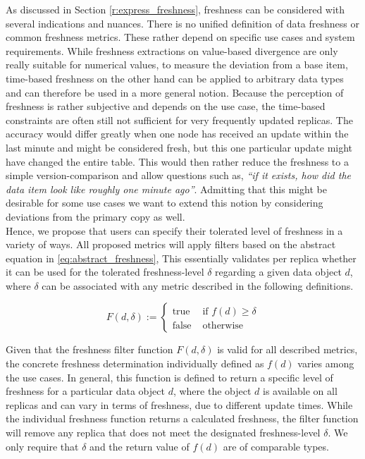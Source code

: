 As discussed in Section \ref{r:express_freshness}, freshness can be considered with several indications and nuances.
There is no unified definition of data freshness or common freshness metrics.
These rather depend on specific use cases and system requirements.
While freshness extractions on value-based divergence are only really suitable for numerical values,
to measure the deviation from a base item, time-based freshness on the other hand can be applied to arbitrary data types and can therefore be used 
in a more general notion.
Because the perception of freshness is rather subjective and depends on the use case, the time-based constraints are often still not sufficient for very frequently
updated replicas.
The accuracy would differ greatly when one node has received an update within the last minute and might be considered fresh, but this one particular 
update might have changed the entire table. 
This would then rather reduce the freshness to a simple version-comparison and allow questions such as, \textit{``if it exists, how did the data item look like roughly one minute ago''}.
Admitting that this might be desirable for some use cases we want to extend this notion by considering deviations from the primary copy as well.\\
Hence, we propose that users can specify their tolerated level of freshness in a variety of ways. 
All proposed metrics will apply filters based on the abstract equation in \ref{eq:abstract_freshness}, 
This essentially validates per replica whether it can be used for the tolerated freshness-level $\delta$ regarding a given data object $d$,
where $\delta$ can be associated with any metric described in the following definitions.

\begin{equation} \label{eq:abstract_freshness}
    F(d, \delta) :=
        \begin{cases}
            \text{true } & \text{if } f(d) \geq \delta\\
            \text{false } & \text{otherwise }
        \end{cases}
\end{equation}


Given that the freshness filter function $F(d, \delta)$ is valid for all described metrics, the concrete freshness determination individually defined as $f(d)$ 
varies among the use cases.
In general, this function is defined to return a specific level of freshness for a particular data object $d$,
where the object $d$ is available on all replicas and can vary in terms of freshness, due to different update times.
While the individual freshness function returns a calculated freshness, the filter function will remove any replica that does not meet the designated freshness-level $\delta$. 
We only require that $\delta$ and the return value of $f(d)$ are of comparable types.


